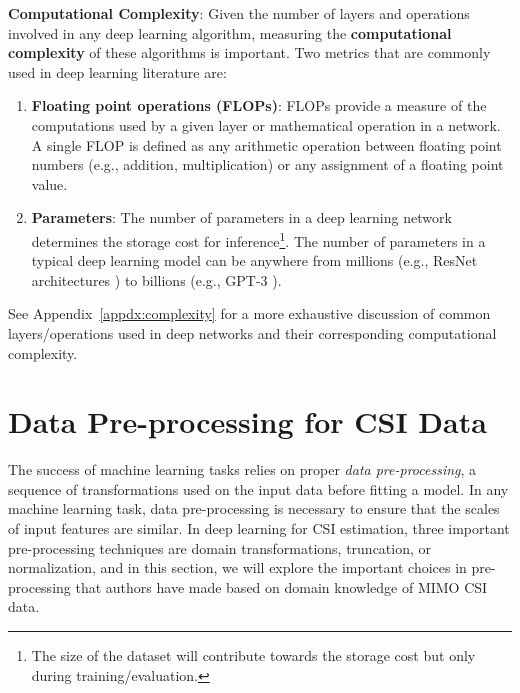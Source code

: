 \textbf{Computational Complexity}: Given the number of layers and operations involved in any deep learning algorithm, measuring the \textbf{computational complexity} of these algorithms is important. Two metrics that are commonly used in deep learning literature are:

\begin{enumerate}
	\item \textbf{Floating point operations (FLOPs)}: FLOPs provide a measure of the computations used by a given layer or mathematical operation in a network. A single FLOP is defined as any arithmetic operation between floating point numbers (e.g., addition, multiplication) or any assignment of a floating point value.
	\item \textbf{Parameters}: The number of parameters in a deep learning network determines the storage cost for inference\footnote{The size of the dataset will contribute towards the storage cost but only during training/evaluation.}. The number of parameters in a typical deep learning model can be anywhere from millions (e.g., ResNet architectures \cite{ref:he2016identity}) to billions (e.g., GPT-3 \cite{ref:brown2020language}).
\end{enumerate}

See Appendix~\ref{appdx:complexity} for a more exhaustive discussion of common layers/operations used in deep networks and their corresponding computational complexity.


\section{Data Pre-processing for CSI Data} \label{sec:data-preprocessing}

The success of machine learning tasks relies on proper \emph{data pre-processing}, a sequence of transformations used on the input data before fitting a model. In any machine learning task, data pre-processing is necessary to ensure that the scales of input features are similar. In deep learning for CSI estimation, three important pre-processing techniques are domain transformations, truncation, or normalization, and in this section, we will explore the important choices in pre-processing that authors have made based on domain knowledge of MIMO CSI data.

